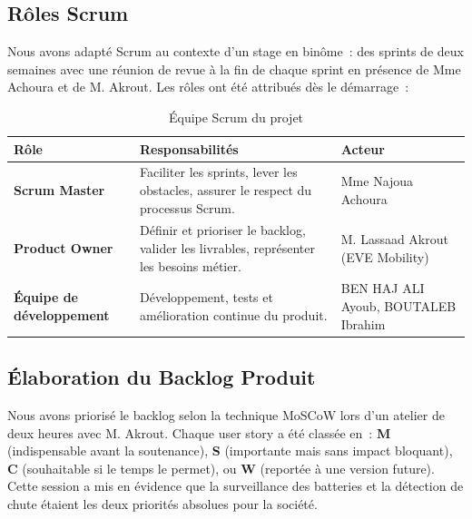 \documentclass[12pt, a4paper]{report}
\begin{document}
\subsection{Rôles Scrum}

Nous avons adapté Scrum au contexte d'un stage en binôme~: des sprints de deux semaines
avec une réunion de revue à la fin de chaque sprint en présence de Mme Achoura et de
M. Akrout. Les rôles ont été attribués dès le démarrage~:

\begin{table}[H]
  \centering
  \caption{Équipe Scrum du projet}
  \label{tab:scrum}
  \renewcommand{\arraystretch}{1.4}
  \begin{tabularx}{\textwidth}{|p{3cm}|X|p{4cm}|}
    \hline
    \rowcolor{isimablue!20}
    \textbf{Rôle} & \textbf{Responsabilités} & \textbf{Acteur} \\
    \hline
    \textbf{Scrum Master} & Faciliter les sprints, lever les obstacles, assurer le respect du processus Scrum. & Mme Najoua Achoura \\
    \hline
    \textbf{Product Owner} & Définir et prioriser le backlog, valider les livrables, représenter les besoins métier. & M. Lassaad Akrout (EVE Mobility) \\
    \hline
    \textbf{Équipe de développement} & Développement, tests et amélioration continue du produit. & BEN HAJ ALI Ayoub, BOUTALEB Ibrahim \\
    \hline
  \end{tabularx}
\end{table}

\subsection{Élaboration du Backlog Produit}

Nous avons priorisé le backlog selon la technique MoSCoW lors d'un atelier de deux
heures avec M. Akrout. Chaque user story a été classée en~: \textbf{M} (indispensable
avant la soutenance), \textbf{S} (importante mais sans impact bloquant), \textbf{C}
(souhaitable si le temps le permet), ou \textbf{W} (reportée à une version future).
Cette session a mis en évidence que la surveillance des batteries et la détection de
chute étaient les deux priorités absolues pour la société.
\end{document}
